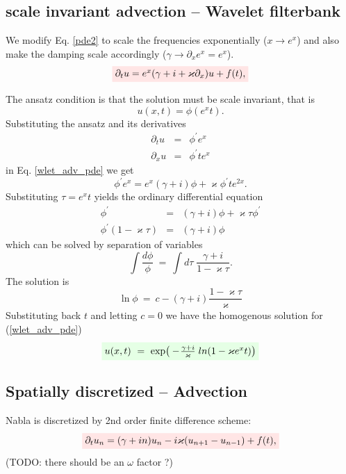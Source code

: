 \documentclass[11pt,twocolumn]{article}
\newcommand{\be}{\begin{equation}}
\newcommand{\ee}{\end{equation}}
\newcommand{\bea}{\begin{eqnarray*}}
\newcommand{\eea}{\end{eqnarray*}}
\newcommand{\w}{\omega}
\newcommand{\ka}{\varkappa}
\newcommand{\rbox}[1]{\colorbox{red!10}{$#1$}}
\newcommand{\gbox}[1]{\colorbox{green!10}{$#1$}}
\begin{document}
\subsection{scale invariant advection -- Wavelet filterbank}

We modify Eq. \ref{pde2} to scale the frequencies exponentially ($x \rightarrow e^x$) and also make
the damping scale accordingly ($\gamma \rightarrow \partial_x e^x = e^x$).
\be \label{wlet_adv_pde}
    \rbox{\partial_t u = e^x (\gamma + i + \varkappa\partial_x) u  +  f(t),}
\ee

The ansatz condition is that the solution must be scale invariant, that is
\be \label{wlet_adv_ansatz}
    u(x,t) = \phi(e^xt).
\ee
Substituting the ansatz and its derivatives
\bea
   \partial_t u  &=&  \phi^\prime e^x \\
   \partial_x u  &=&  \phi^\prime t e^x
\eea
in Eq. \ref{wlet_adv_pde} we get
\be
   \phi^\prime e^x  =  e^x(\gamma + i)\phi + \varkappa\phi^\prime t e^{2x}.
\ee
Substituting $\tau = e^xt$ yields the ordinary differential equation
\bea
   \phi^\prime  &=&  (\gamma + i) \phi + \varkappa\tau\phi^\prime \\
   \phi^\prime (1 - \varkappa\tau)  &=&  (\gamma + i) \phi
\eea
which can be solved by separation of variables
\be
   \int\! \frac{d\phi}{\phi} \ =\  \int\!\! d\tau \; \frac{\gamma + i}{1 - \varkappa\tau}.
\ee
The solution is
\be
   \ln \phi \ = \ c - (\gamma + i) \frac{1 - \varkappa\tau}{\varkappa}
\ee
Substituting back $t$ and letting $c=0$ we have the homogenous solution for (\ref{wlet_adv_pde})
\be \label{wlet_adv_solution}
    \gbox{ u(x,t) \ = \ \exp\!\big(-\!\frac{\gamma+i}{\varkappa} \; ln(1-\varkappa e^x t)\big) }
\ee








\subsection{Spatially discretized -- Advection}


Nabla is discretized by 2nd order finite difference scheme:
\be \label{pdiffe}
    \rbox{\partial_t u_n = (\gamma + i n) u_n - i \ka ( u_{n+1} - u_{n-1} )  +  f(t),}
\ee
(TODO: there should be an $\w$ factor ?)
\end{document}
